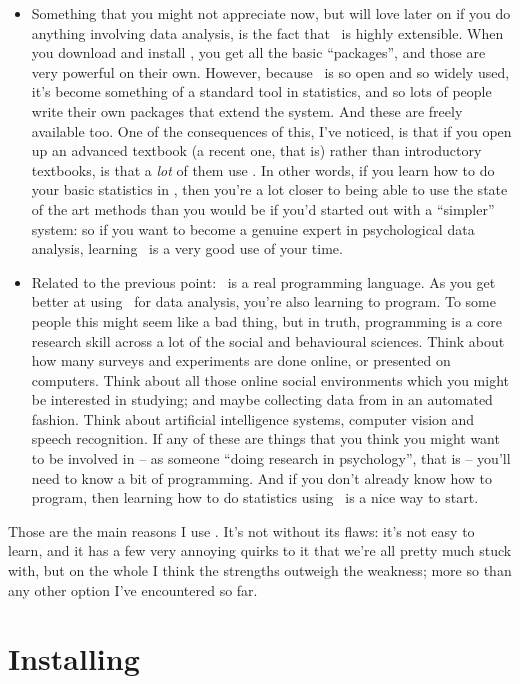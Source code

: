 \begin{itemize}
\item Something that you might not appreciate now, but will love later on if you do anything involving data analysis, is the fact that \R\ is highly extensible. When you download and install \R, you get all the basic ``packages'', and those are very powerful on their own. However, because \R\ is so open and so widely used, it's become something of a standard tool in statistics, and so lots of people write their own packages that extend the system. And these are freely available too. One of the consequences of this, I've noticed, is that if you open up an advanced textbook (a recent one, that is) rather than introductory textbooks, is that a {\it lot} of them use \R. In other words, if you learn how to do your basic statistics in \R, then you're a lot closer to being able to use the state of the art methods than you would be if you'd started out with a ``simpler'' system: so if you want to become a genuine expert in psychological data analysis, learning \R\ is a very good use of your time.
\item Related to the previous point: \R\ is a real programming language. As you get better at using \R\ for data analysis, you're also learning to program. To some people this might seem like a bad thing, but in truth, programming is a core research skill across a lot of the social and behavioural sciences. Think about how many surveys and experiments are done online, or presented on computers. Think about all those online social environments which you might be interested in studying; and maybe collecting data from in an automated fashion. Think about artificial intelligence systems, computer vision and speech recognition. If any of these are things that you think you might want to be involved in -- as someone ``doing research in psychology'', that is -- you'll need to know a bit of programming. And if you don't already know how to program, then learning how to do statistics using  \R\  is a nice way to start.
\end{itemize}
Those are the main reasons I use \R. It's not without its flaws: it's not easy to learn, and it has a few very annoying quirks to it that we're all pretty much stuck with, but on the whole I think the strengths outweigh the weakness; more so than any other option I've encountered so far. 



\section{Installing  \R~\label{sec:gettingR}}


